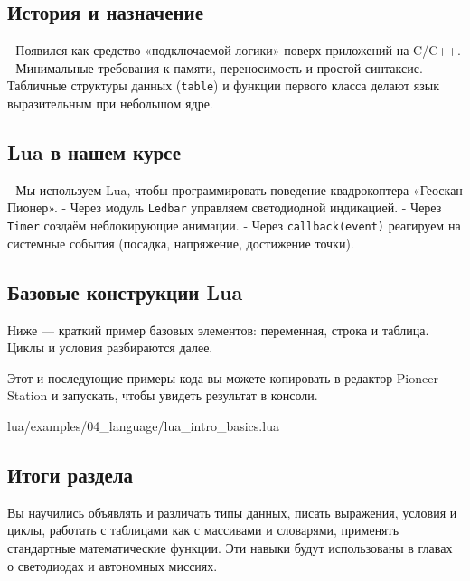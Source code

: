 \subsection{История и назначение}
- Появился как средство «подключаемой логики» поверх приложений на C/C++.
- Минимальные требования к памяти, переносимость и простой синтаксис.
- Табличные структуры данных (\verb|table|) и функции первого класса делают язык выразительным при небольшом ядре.

\subsection{Lua в нашем курсе}
- Мы используем Lua, чтобы программировать поведение квадрокоптера «Геоскан Пионер».
- Через модуль \verb|Ledbar| управляем светодиодной индикацией.
- Через \verb|Timer| создаём неблокирующие анимации.
- Через \verb|callback(event)| реагируем на системные события (посадка, напряжение, достижение точки).

\subsection{Базовые конструкции Lua}
Ниже — краткий пример базовых элементов: переменная, строка и таблица. Циклы и условия разбираются далее.
\begin{infobox}[Практика]
    Этот и последующие примеры кода вы можете копировать в редактор Pioneer Station и запускать, чтобы увидеть результат в консоли.
\end{infobox}
\begin{codefile}{lua/examples/04_language/lua_intro_basics.lua}
\end{codefile}
\subsection*{Итоги раздела}
Вы научились объявлять и различать типы данных, писать выражения, условия и циклы, работать с таблицами как с массивами и словарями, применять стандартные математические функции. Эти навыки будут использованы в главах о светодиодах и автономных миссиях.
